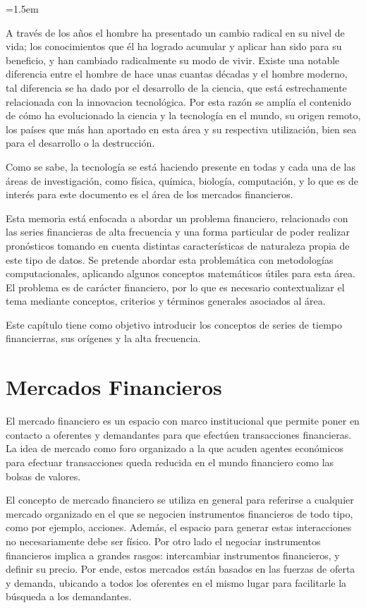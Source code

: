 \parindent=1.5em

A través de los años el hombre ha presentado un cambio radical en su nivel de vida; los conocimientos que él ha logrado acumular y aplicar han sido para su beneficio,
y han cambiado radicalmente su modo de vivir. Existe una notable diferencia entre el hombre de hace unas cuantas décadas y el hombre moderno, tal diferencia se ha
dado por el desarrollo de la ciencia, que está estrechamente relacionada con la innovacion tecnológica. Por esta razón se amplía el contenido de cómo ha
evolucionado la ciencia y la tecnología en el mundo, su origen remoto, los países que más han aportado en esta área y su respectiva utilización, bien sea para
el desarrollo o la destrucción.

Como se sabe, la tecnología se está haciendo presente en todas y cada una de las áreas de investigación, como física, química, biología, computación, y lo que es de
interés para este documento es el área de los mercados financieros.

Esta memoria está enfocada a abordar un problema financiero, relacionado con las series financieras de alta frecuencia y una forma particular
de poder realizar pronósticos tomando en cuenta distintas características de naturaleza propia de este tipo de datos. 
Se pretende abordar esta problemática con metodologías computacionales, aplicando algunos conceptos matemáticos
útiles para esta área. El problema es de carácter financiero, por lo que es necesario contextualizar el tema mediante conceptos, criterios 
y términos generales asociados al área.

Este capítulo tiene como objetivo introducir los conceptos de series de tiempo financierras, sus orígenes y la alta frecuencia.

\section{Mercados Financieros}

El mercado financiero es un espacio con marco institucional que permite poner en contacto a oferentes y demandantes para que efectúen
transacciones financieras. La idea de mercado como foro organizado a la que acuden agentes económicos para efectuar transacciones
queda reducida en el mundo financiero como las bolsas de valores.

El concepto de mercado financiero se utiliza en general para referirse a cualquier mercado organizado en el que se negocien instrumentos financieros
de todo tipo, como por ejemplo, acciones. Además, el espacio para generar estas interacciones no necesariamente debe ser físico. Por otro lado el negociar
instrumentos financieros implica a grandes rasgos: intercambiar instrumentos financieros, y definir su precio. Por ende, estos mercados están basados en
las fuerzas de oferta y demanda, ubicando a todos los oferentes en el mismo lugar para facilitarle la búsqueda a los demandantes.

